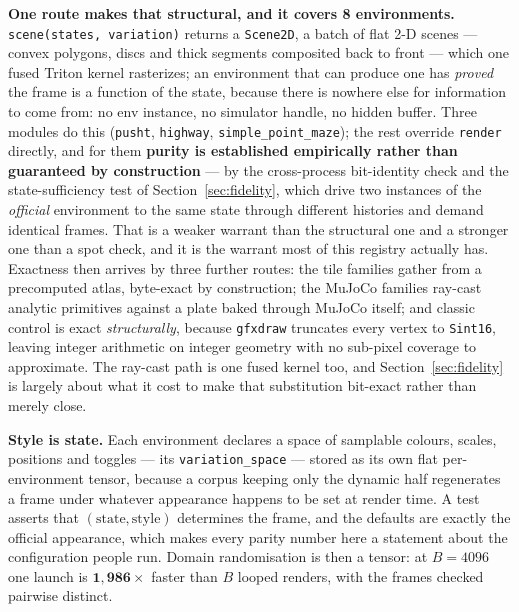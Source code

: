 \documentclass{article}
\begin{document}
\textbf{One route makes that structural, and it covers 8 environments.}
\texttt{scene(states, variation)} returns a \texttt{Scene2D}, a batch of flat
2-D scenes --- convex polygons, discs and thick segments composited back to
front --- which one fused Triton kernel rasterizes; an environment that can
produce one has \emph{proved} the frame is a function of the state, because
there is nowhere else for information to come from: no env instance, no
simulator handle, no hidden buffer. Three modules do this (\texttt{pusht},
\texttt{highway}, \texttt{simple\_point\_maze}); the rest override
\texttt{render} directly, and for them \textbf{purity is established
empirically rather than guaranteed by construction} --- by the cross-process
bit-identity check and the state-sufficiency test of
Section~\ref{sec:fidelity}, which drive two instances of the \emph{official}
environment to the same state through different histories and demand identical
frames. That is a weaker warrant than the structural one and a stronger one
than a spot check, and it is the warrant most of this registry actually has.
Exactness then arrives by three further routes: the tile families gather from a precomputed atlas, byte-exact by
construction; the MuJoCo families ray-cast
analytic primitives against a plate baked through MuJoCo itself; and classic
control is exact \emph{structurally}, because \texttt{gfxdraw} truncates every
vertex to \texttt{Sint16}, leaving integer arithmetic on integer geometry with
no sub-pixel coverage to approximate. The ray-cast path is one fused kernel
too, and Section~\ref{sec:fidelity} is largely about what it cost to make that
substitution bit-exact rather than merely close.

\textbf{Style is state.} Each environment declares a space of samplable
colours, scales, positions and toggles --- its \texttt{variation\_space} ---
stored as its own flat per-environment tensor, because a corpus keeping only
the dynamic half regenerates a frame under whatever appearance happens to be
set at render time. A test asserts that
$(\mathrm{state}, \mathrm{style})$ determines the frame, and the defaults are
exactly the official appearance, which makes every parity number here a
statement about the configuration people run. Domain randomisation is then a
tensor: at $B = 4096$ one launch is $\mathbf{1{,}986\times}$ faster than $B$
looped renders, with the frames checked pairwise distinct.
\end{document}
